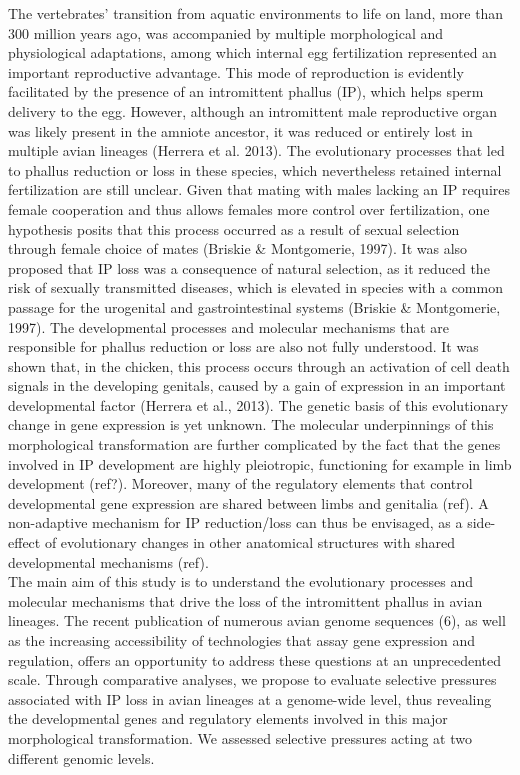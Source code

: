 The vertebrates’ transition from aquatic environments to life on land, more than 300 million years ago, was accompanied by multiple morphological and physiological adaptations, among which internal egg fertilization represented an important reproductive advantage. This mode of reproduction is evidently facilitated by the presence of an intromittent phallus (IP), which helps sperm delivery to the egg. However, although an intromittent male reproductive organ was likely present in the amniote ancestor, it was reduced or entirely lost in multiple avian lineages (Herrera et al. 2013). The evolutionary processes that led to phallus reduction or loss in these species, which nevertheless retained internal fertilization are still unclear. Given that mating with males lacking an IP requires female cooperation and thus allows females more control over fertilization, one hypothesis posits that this process occurred as a result of sexual selection through female choice of mates (Briskie & Montgomerie, 1997). It was also proposed that IP loss was a consequence of natural selection, as it reduced the risk of sexually transmitted diseases, which is elevated in species with a common passage for the urogenital and gastrointestinal systems (Briskie & Montgomerie, 1997). The developmental processes and molecular mechanisms that are responsible for phallus reduction or loss are also not fully understood. It was shown that, in the chicken, this process occurs through an activation of cell death  signals  in  the  developing  genitals,  caused  by  a  gain  of  expression  in  an  important  developmental  factor (Herrera et al., 2013). The genetic basis of this evolutionary change in gene expression is yet unknown. The molecular underpinnings of this morphological transformation are further complicated by the fact that the genes involved in IP development are highly pleiotropic, functioning for example in limb development (ref?). Moreover, many of the regulatory elements that control developmental gene expression are shared between limbs and genitalia (ref). A non-adaptive mechanism for IP reduction/loss can thus be envisaged, as a side-effect of evolutionary changes in other anatomical structures with shared developmental mechanisms (ref).\\

The main aim of this study is to understand the evolutionary processes and molecular mechanisms that drive the loss of the intromittent phallus in avian lineages. The recent publication of numerous avian genome sequences (6), as well as the increasing accessibility of technologies that assay gene expression and regulation, offers an opportunity to address these questions at an unprecedented scale. Through comparative analyses, we propose to evaluate selective pressures associated with IP loss in avian lineages at a genome-wide level, thus revealing the developmental genes and regulatory elements involved in this major morphological transformation. We assessed selective pressures acting at two different genomic levels. \\

